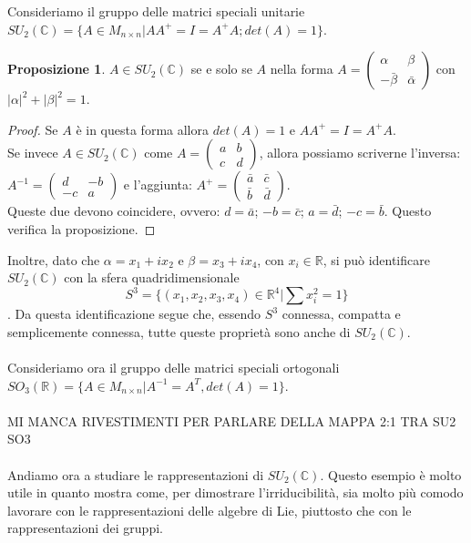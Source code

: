 \documentclass[12pt,a4paper]{report}
\theoremstyle{definition}
\newtheorem{Prop}[Def]{Proposizione}
\theoremstyle{definition}
\theoremstyle{definition}
\theoremstyle{remark}
\begin{document}
Consideriamo il gruppo delle matrici speciali unitarie $SU_2(\mathbb{C})=\{A\in M_{n\times n}|AA^{+}=I=A^{+}A;det(A)=1\}$.
\begin{Prop}
	$A\in SU_2(\mathbb{C})$ se e solo se $A$ nella forma $A=
	\begin{pmatrix}
		\alpha & \beta \\
		-\bar{\beta} & \bar{\alpha}
	\end{pmatrix}
	$ con $|\alpha|^2+|\beta|^2=1$.
\end{Prop}
\begin{proof}
	Se $A$ è in questa forma allora $det(A)=1$ e $AA^{+}=I=A^{+}A$.\\
	Se invece $A\in SU_2(\mathbb{C})$ come $A=
	\begin{pmatrix}
		a & b \\
		c & d
	\end{pmatrix}$, allora possiamo scriverne l'inversa:
$A^{-1}=\begin{pmatrix}
	d & -b \\
	-c & a
\end{pmatrix}$ e l'aggiunta: $A^+=
\begin{pmatrix}
	\bar{a} & \bar{c} \\
	\bar{b} & \bar{d}
\end{pmatrix}$.\\
Queste due devono coincidere, ovvero: $d=\bar{a}$; $-b=\bar{c}$; $a=\bar{d}$; $-c=\bar{b}$. Questo verifica la proposizione.
\end{proof}
Inoltre, dato che $\alpha=x_1+ix_2$ e $\beta=x_3+ix_4$, con $x_i\in\mathbb{R}$, si può identificare $SU_2(\mathbb{C})$ con la sfera quadridimensionale $$S^3=\{(x_1,x_2,x_3,x_4)\in \mathbb{R}^4|\sum x_i^2=1\}$$.
Da questa identificazione segue che, essendo $S^3$ connessa, compatta e semplicemente connessa, tutte queste proprietà sono anche di $SU_2(\mathbb{C})$.\\
\\
Consideriamo ora il gruppo delle matrici speciali ortogonali $SO_3(\mathbb{R})=\{A\in M_{n\times n}|A^{-1}=A^T, det(A)=1\}$.
\\
\\
MI MANCA RIVESTIMENTI PER PARLARE DELLA MAPPA 2:1 TRA SU2 SO3
\\
\\
Andiamo ora a studiare le rappresentazioni di $SU_2(\mathbb{C})$. Questo esempio è molto utile in quanto mostra come, per dimostrare l'irriducibilità, sia molto più comodo lavorare con le rappresentazioni delle algebre di Lie, piuttosto che con le rappresentazioni dei gruppi.\\
\end{document}
